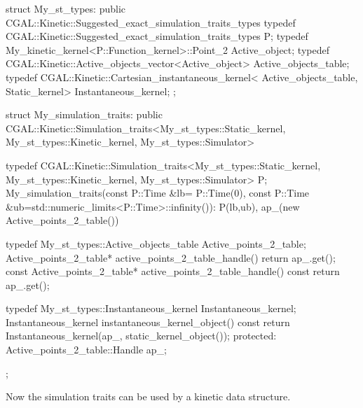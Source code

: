 \begin{ccExampleCode}
struct My_st_types: public CGAL::Kinetic::Suggested_exact_simulation_traits_types {
  typedef CGAL::Kinetic::Suggested_exact_simulation_traits_types P;
  typedef My_kinetic_kernel<P::Function_kernel>::Point_2 Active_object;
  typedef CGAL::Kinetic::Active_objects_vector<Active_object> Active_objects_table;
  typedef CGAL::Kinetic::Cartesian_instantaneous_kernel< Active_objects_table,
							 Static_kernel> Instantaneous_kernel;
};

struct My_simulation_traits:
  public  CGAL::Kinetic::Simulation_traits<My_st_types::Static_kernel,
			    My_st_types::Kinetic_kernel,
			    My_st_types::Simulator>
{
  typedef  CGAL::Kinetic::Simulation_traits<My_st_types::Static_kernel,
					    My_st_types::Kinetic_kernel,
					    My_st_types::Simulator> P;
  My_simulation_traits(const P::Time &lb= P::Time(0),
		       const P::Time &ub=std::numeric_limits<P::Time>::infinity()): 
    P(lb,ub), 
    ap_(new Active_points_2_table()) {}

  typedef My_st_types::Active_objects_table Active_points_2_table;
  Active_points_2_table* active_points_2_table_handle() {
    return ap_.get();
  }
  const Active_points_2_table* active_points_2_table_handle() const {
    return ap_.get();
  }

  typedef My_st_types::Instantaneous_kernel Instantaneous_kernel;
  Instantaneous_kernel instantaneous_kernel_object() const
  {
    return Instantaneous_kernel(ap_, static_kernel_object());
  }
protected:
  Active_points_2_table::Handle ap_;
};
\end{ccExampleCode}

Now the simulation traits can be used by a kinetic data structure.
